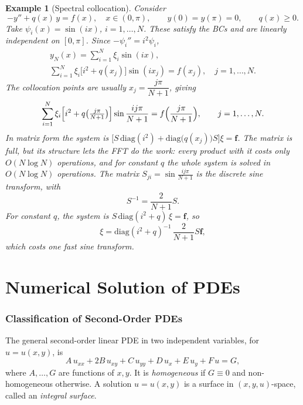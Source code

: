 \documentclass[11pt,a4paper]{article}
\numberwithin{equation}{section}
\theoremstyle{spacedplain}
\theoremstyle{spaceddefinition}
\newtheorem{example}[theorem]{Example}
\theoremstyle{spacedremark}
\begin{document}
\begin{example}[Spectral collocation]
Consider
\[
  -y''+q(x)\,y=f(x),\quad x\in(0,\pi),
  \qquad y(0)=y(\pi)=0,\qquad q(x)\ge 0.
\]
Take \(\psi_i(x)=\sin(ix)\), \(i=1,\dots,N\).  These satisfy the BCs and
are linearly independent on \([0,\pi]\).  Since \(-\psi_i''=i^2\psi_i\),
\[
\begin{gathered}
  y_N(x)=\sum_{i=1}^N\xi_i\sin(ix),
  \\
  \sum_{i=1}^N \xi_i\bigl[i^2+q(x_j)\bigr]\sin(ix_j)=f(x_j),
  \quad j=1,\dots,N.
\end{gathered}
\]
The collocation points are usually \(x_j=\dfrac{j\pi}{N+1}\), giving
\[
  \sum_{i=1}^N \xi_i\Bigl[i^2+q\bigl(\tfrac{j\pi}{N+1}\bigr)\Bigr]
  \sin\frac{ij\pi}{N+1}
  =f\Bigl(\frac{j\pi}{N+1}\Bigr),\qquad j=1,\dots,N.
\]
In matrix form the system is
\(\bigl[S\,\mathrm{diag}(i^2)+\mathrm{diag}\bigl(q(x_j)\bigr)S\bigr]\xi=\mathbf f\).
The matrix is full, but its structure lets the FFT do the work: every
product with it costs only \(O(N\log N)\) operations, and for constant
\(q\) the whole system is solved in \(O(N\log N)\) operations.  The
matrix \(S_{ji}=\sin\frac{ij\pi}{N+1}\) is the discrete sine transform,
with
\[
  S^{-1}=\frac{2}{N+1}S.
\]
For constant \(q\), the system is
\(S\,\mathrm{diag}(i^2+q)\,\xi=\mathbf f\), so
\[
  \xi=\mathrm{diag}(i^2+q)^{-1}\,\frac{2}{N+1}S\mathbf f,
\]
which costs one fast sine transform.
\end{example}

\part{Numerical Solution of PDEs}

\section{Classification of Second-Order PDEs}

The general second-order linear PDE in two independent variables, for
\(u=u(x,y)\), is
\begin{equation}\label{eq:gen}
  A\,u_{xx}+2B\,u_{xy}+C\,u_{yy}+D\,u_x+E\,u_y+F\,u=G,
\end{equation}
where \(A,\dots,G\) are functions of \(x,y\).  It is \emph{homogeneous}
if \(G\equiv0\) and non-homogeneous otherwise.  A solution
\(u=u(x,y)\) is a surface in \((x,y,u)\)-space, called an
\emph{integral surface}.
\end{document}
